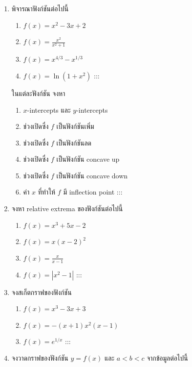 \documentclass[
]{book}
\begin{document}
\begin{enumerate}
\def\labelenumi{\arabic{enumi}.}
\item
  พิจารณาฟังก์ชันต่อไปนี้

  \begin{enumerate}
  \def\labelenumii{\arabic{enumii}.}
  \item
    \(\displaystyle f(x) = x^2-3x+2\)
  \item
    \(\displaystyle f(x) = \frac{x^2}{x^2+1}\)
  \item
    \(\displaystyle f(x) = x^{4/3} - x^{1/3}\)
  \item
    \(\displaystyle f(x) = \ln(1+x^2)\) :::
  \end{enumerate}

  ในแต่ละฟังก์ชัน จงหา

  \begin{enumerate}
  \def\labelenumii{\arabic{enumii}.}
  \item
    \(x\)-intercepts และ \(y\)-intercepts
  \item
    ช่วงเปิดซึ่ง \(f\) เป็นฟังก์ชันเพิ่ม
  \item
    ช่วงเปิดซึ่ง \(f\) เป็นฟังก์ชันลด
  \item
    ช่วงเปิดซึ่ง \(f\) เป็นฟังก์ชัน concave up
  \item
    ช่วงเปิดซึ่ง \(f\) เป็นฟังก์ชัน concave down
  \item
    ค่า \(x\) ที่ทำให้ \(f\) มี inflection point :::
  \end{enumerate}
\item
  จงหา relative extrema ของฟังก์ชันต่อไปนี้

  \begin{enumerate}
  \def\labelenumii{\arabic{enumii}.}
  \item
    \(\displaystyle f(x) = x^3+5x-2\)
  \item
    \(\displaystyle f(x) = x(x-2)^2\)
  \item
    \(\displaystyle f(x) = \frac{x}{x-1}\)
  \item
    \(\displaystyle f(x) = |x^2-1|\) :::
  \end{enumerate}
\item
  จงสเก็ตกราฟของฟังก์ชัน

  \begin{enumerate}
  \def\labelenumii{\arabic{enumii}.}
  \item
    \(f(x) = x^3-3x+3\)
  \item
    \(f(x) = -(x+1)x^2(x-1)\)
  \item
    \(f(x) = e^{1/x}\) :::
  \end{enumerate}
\item
  จงวาดกราฟของฟังก์ชัน \(y=f(x)\) และ \(a<b<c\) จากข้อมูลต่อไปนี้


\end{enumerate}
\end{document}
